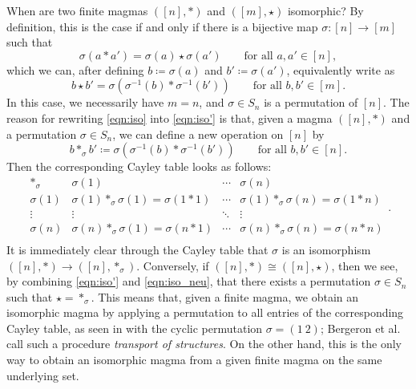 \documentclass[12pt]{article}
\let\Cref\crtCref
\theoremstyle{definition}
\theoremstyle{remark}
\begin{document}
	When are two finite magmas $([n],\ast)$ and $([m], \star)$ isomorphic? By definition, this is the case if and only if there is a bijective map $\sigma \colon [n] \to [m]$ such that
	\begin{equation}\label{eqn:iso}
	\sigma(a\ast a')=\sigma(a)\star\sigma(a') \qquad \text{for all } a,a' \in [n],
	\end{equation}
	which we can, after defining $b\coloneqq \sigma(a)$ and $b'\coloneqq \sigma(a')$, equivalently write as
	\begin{equation}\label{eqn:iso'}
	b\star b' = \sigma(\sigma^{-1}(b)\ast\sigma^{-1}(b')) \qquad \text{for all } b,b' \in [m].
	\end{equation}
	In this case, we necessarily have $m=n$, and $\sigma \in S_n$ is a permutation of $[n]$. The reason for rewriting \eqref{eqn:iso} into \eqref{eqn:iso'} is that, given a magma $([n],\ast)$ and a permutation $\sigma \in S_n$, we can define a new operation on $[n]$ by
	\begin{equation}\label{eqn:iso_neu}
	b \ast_\sigma b' \coloneqq \sigma(\sigma^{-1}(b)\ast\sigma^{-1}(b')) \qquad \text{for all } b,b' \in [n].
	\end{equation}
	Then the corresponding Cayley table looks as follows:
	\[
	\begin{array}{c|ccc}
		\ast_\sigma & \sigma(1) & \cdots & \sigma(n) \\ \hline
		\sigma(1) & \sigma(1)\ast_\sigma\sigma(1) = \sigma(1\ast1) & \cdots & \sigma(1)\ast_\sigma\sigma(n) = \sigma(1\ast n) \\ 
		\vdots & \vdots & \ddots & \vdots \\
		\sigma(n) & \sigma(n)\ast_\sigma\sigma(1) = \sigma(n\ast1) & \cdots & \sigma(n)\ast_\sigma\sigma(n) = \sigma(n\ast n) \\
	\end{array}.
	\]
	It is immediately clear through the Cayley table that $\sigma$ is an isomorphism $([n],\ast) \to ([n],\ast_\sigma)$. Conversely, if $([n],\ast) \cong ([n],\star)$, then we see, by combining \eqref{eqn:iso'} and \eqref{eqn:iso_neu}, that there exists a permutation $\sigma\in S_n$ such that $\star = \ast_\sigma$. This means that, given a finite magma, we obtain an isomorphic magma by applying a permutation to all entries of the corresponding Cayley table, as seen in \Cref{ex:tables} with the cyclic permutation $\sigma = (1\:2)$; Bergeron et al.\ \cite{BLL} call such a procedure \emph{transport of structures}. On the other hand, this is the only way to obtain an isomorphic magma from a given finite magma on the same underlying set.
	
\end{document}
